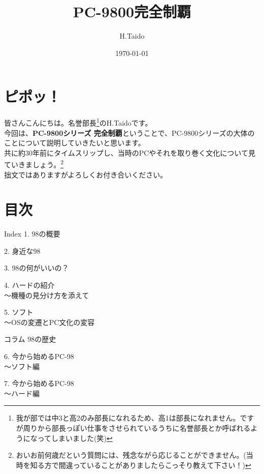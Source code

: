 \documentclass[b5paper,9pt]{jsarticle}
\begin{document}
\title{PC-9800完全制覇}
\author{H.Taido}
\date{\today}
\maketitle
\thispagestyle{empty}

\begin{multicols*}{3}
  
\section*{ピポッ！}
皆さんこんにちは。名誉部長\footnote{我が部では中3と高2のみ部長になれるため、高1は部長になれません。ですが周りから部長っぽい仕事をさせられているうちに名誉部長とか呼ばれるようになってしまいました(笑)}のH.Taidoです。\\
今回は、{\bf PC-9800シリーズ 完全制覇}ということで、PC-9800シリーズの大体のことについて説明していきたいと思います。\\共に約30年前にタイムスリップし、当時のPCやそれを取り巻く文化について見ていきましょう。\footnote{おいお前何歳だという質問には、残念ながら応じることができません。(当時を知る方で間違っていることがありましたらこっそり教えて下さい！)}\\
拙文ではありますがよろしくお付き合いください。
\section*{目次}
\begin{itembox}[l]{Index}
  1. 98の概要

  2. 身近な98

  3. 98の何がいいの？

  4. ハードの紹介
  \\〜機種の見分け方を添えて

  5. ソフト
  \\〜OSの変遷とPC文化の変容

  コラム 98の歴史

  6. 今から始めるPC-98
  \\〜ソフト編

  7. 今から始めるPC-98
  \\〜ハード編


\end{itembox}
\end{multicols*}
\end{document}
